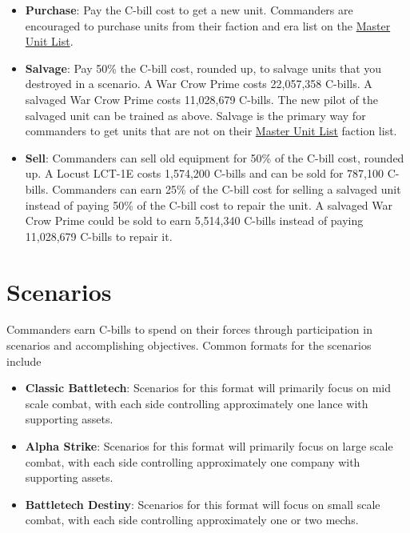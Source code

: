 \documentclass[UTF8]{article}
\begin{document}
\begin{itemize}
\item {\bf Purchase}: Pay the C-bill cost to get a new unit.
Commanders are encouraged to purchase units from their faction and era list on the \href{http://www.masterunitlist.info/}{Master Unit List}.

\item {\bf Salvage}: Pay 50\% the C-bill cost, rounded up, to salvage units that you destroyed in a scenario.
A War Crow Prime costs 22,057,358 C-bills.
A salvaged War Crow Prime costs 11,028,679 C-bills.
The new pilot of the salvaged unit can be trained as above.
Salvage is the primary way for commanders to get units that are not on their \href{http://www.masterunitlist.info/}{Master Unit List} faction list.

\item {\bf Sell}: Commanders can sell old equipment for 50\% of the C-bill cost, rounded up.
A Locust LCT-1E costs 1,574,200 C-bills and can be sold for 787,100 C-bills.
Commanders can earn 25\% of the C-bill cost for selling a salvaged unit instead of paying 50\% of the C-bill cost to repair the unit.
A salvaged War Crow Prime could be sold to earn 5,514,340 C-bills instead of paying 11,028,679 C-bills to repair it.

\end{itemize}

\newpage

\section{Scenarios}

Commanders earn C-bills to spend on their forces through participation in scenarios and accomplishing objectives.
Common formats for the scenarios include

\begin{itemize}

\item {\bf Classic Battletech}: Scenarios for this format will primarily focus on mid scale combat, with each side controlling approximately one lance with supporting assets.

\item {\bf Alpha Strike}: Scenarios for this format will primarily focus on large scale combat, with each side controlling approximately one company with supporting assets.

\item {\bf Battletech Destiny}: Scenarios for this format will focus on small scale combat, with each side controlling approximately one or two mechs.

\end{itemize}
\end{document}
